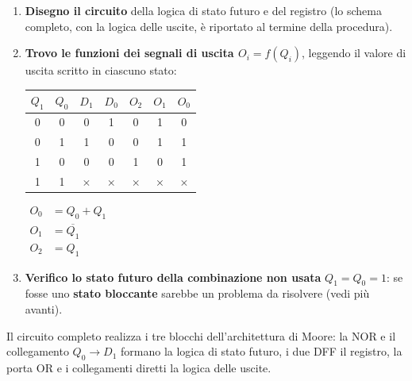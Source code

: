 \begin{enumerate}[leftmargin=1.8em, itemsep=4pt, label=\textbf{\arabic*)}]
    \item \textbf{Disegno il circuito} della logica di stato futuro e del registro (lo
          schema completo, con la logica delle uscite, è riportato al termine della
          procedura).
    \item \textbf{Trovo le funzioni dei segnali di uscita $O_i = f(Q_i)$}, leggendo il
          valore di uscita scritto in ciascuno stato:
\begin{center}
\begin{tabular}{cc|cc|ccc}
\toprule
$Q_1$ & $Q_0$ & $D_1$ & $D_0$ & $O_2$ & $O_1$ & $O_0$ \\
\midrule
0 & 0 & 0 & 1 & 0 & 1 & 0 \\
0 & 1 & 1 & 0 & 0 & 1 & 1 \\
1 & 0 & 0 & 0 & 1 & 0 & 1 \\
1 & 1 & $\times$ & $\times$ & $\times$ & $\times$ & $\times$ \\
\bottomrule
\end{tabular}
\qquad
$\begin{aligned}
O_0 &= Q_0 + Q_1 \\
O_1 &= \overline{Q_1} \\
O_2 &= Q_1
\end{aligned}$
\end{center}
    \item \textbf{Verifico lo stato futuro della combinazione non usata}
          $Q_1=Q_0=1$: se fosse uno \textbf{stato bloccante} sarebbe un problema da
          risolvere (vedi più avanti).
\end{enumerate}

\noindent Il circuito completo realizza i tre blocchi dell'architettura di Moore: la NOR
e il collegamento $Q_0\to D_1$ formano la logica di stato futuro, i due DFF il registro, la
porta OR e i collegamenti diretti la logica delle uscite.

